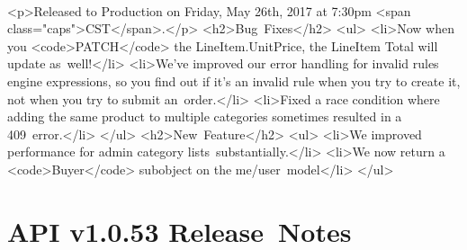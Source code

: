 \documentclass{memoir}%
\begin{document}
\paragraph*{}%
<p>Released to Production on Friday, May 26th, 2017 at 7:30pm <span class="caps">CST</span>.</p>\newline%
<h2>Bug~Fixes</h2>\newline%
<ul>\newline%
<li>Now when you <code>PATCH</code> the LineItem.UnitPrice, the LineItem Total will update as~well!</li>\newline%
<li>We’ve improved our error handling for invalid rules engine expressions, so you find out if it’s an invalid rule when you try to create it, not when you try to submit an~order.</li>\newline%
<li>Fixed a race condition where adding the same product to multiple categories sometimes resulted in a 409~error.</li>\newline%
</ul>\newline%
<h2>New~Feature</h2>\newline%
<ul>\newline%
<li>We improved performance for admin category lists~substantially.</li>\newline%
<li>We now return a <code>Buyer</code> subobject on the me/user~model</li>\newline%
</ul>

%
\section*{API v1.0.53 Release~Notes}%
\paragraph*{}%

%
\end{document}
